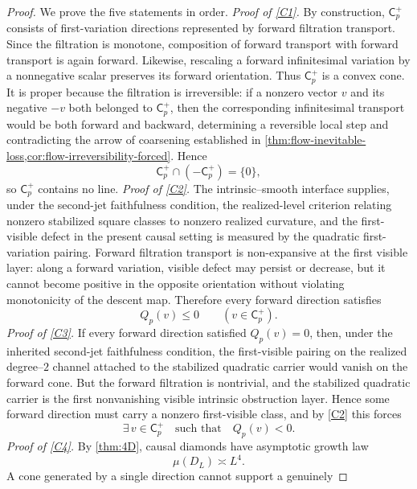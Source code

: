 \begin{proof}
	We prove the five statements in order.
	\smallskip
	\noindent
	\textit{Proof of \textup{\ref{C1}}.}
	By construction, \(\mathsf C_p^+\) consists of first-variation
	directions represented by forward filtration transport.  Since the
	filtration is monotone, composition of forward transport with forward
	transport is again forward.  Likewise, rescaling a forward infinitesimal
	variation by a nonnegative scalar preserves its forward orientation.
	Thus \(\mathsf C_p^+\) is a convex cone.
	It is proper because the filtration is irreversible: if a nonzero vector
	\(v\) and its negative \(-v\) both belonged to \(\mathsf C_p^+\), then
	the corresponding infinitesimal transport would be both forward and
	backward, determining a reversible local step and contradicting the arrow of
	coarsening established in
	\cref{thm:flow-inevitable-loss,cor:flow-irreversibility-forced}.  Hence
	\[
		\mathsf C_p^+\cap(-\mathsf C_p^+)=\{0\},
	\]
	so \(\mathsf C_p^+\) contains no line.
	\smallskip
	\noindent
	\textit{Proof of \textup{\ref{C2}}.}
	The intrinsic--smooth interface supplies, under the second-jet faithfulness condition, the realized-level criterion relating nonzero
	stabilized square classes to nonzero realized curvature, and the
	first-visible defect in the present causal setting is measured by the
	quadratic first-variation pairing.  Forward filtration transport is
	non-expansive at the first visible layer: along a forward variation,
	visible defect may persist or decrease, but it cannot become positive in
	the opposite orientation without violating monotonicity of the descent
	map.  Therefore every forward direction satisfies
	\[
		Q_p(v)\le 0
		\qquad
		(v\in \mathsf C_p^+).
	\]
	\smallskip
	\noindent
	\textit{Proof of \textup{\ref{C3}}.}
	If every forward direction satisfied \(Q_p(v)=0\), then, under the
	inherited second-jet faithfulness condition, the first-visible pairing
	on the realized degree--\(2\) channel attached to the stabilized
	quadratic carrier would vanish on the forward cone.  But the forward
	filtration is nontrivial, and the stabilized quadratic carrier is the
	first nonvanishing visible intrinsic obstruction layer.  Hence some
	forward direction must carry a nonzero first-visible class, and by
	\textup{\ref{C2}} this forces
	\[
		\exists\,v\in\mathsf C_p^+
		\quad\text{such that}\quad
		Q_p(v)<0.
	\]
	\smallskip
	\noindent
	\textit{Proof of \textup{\ref{C4}}.}
	By \cref{thm:4D}, causal diamonds have asymptotic growth law
	\[
		\mu(D_L)\asymp L^4.
	\]
	A cone generated by a single direction cannot support a genuinely

\end{proof}
